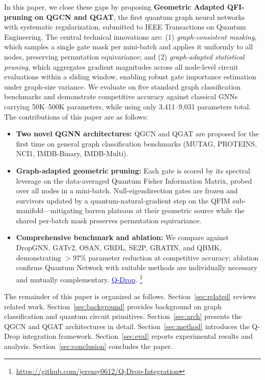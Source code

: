 \documentclass[journal]{IEEEtran}
\begin{document}
In this paper, we close these gaps by proposing \textbf{Geometric Adapted QFI-pruning on QGCN and QGAT}, the first quantum graph neural networks with systematic
regularization, submitted to IEEE Transactions on Quantum Engineering.
The central technical innovations are: (1) \emph{graph-consistent
masking}, which samples a single gate mask per mini-batch and applies
it uniformly to all nodes, preserving permutation equivariance; and
(2) \emph{graph-adapted statistical pruning}, which aggregates gradient
magnitudes across all node-level circuit evaluations within a sliding
window, enabling robust gate importance estimation under graph-size
variance. We evaluate on five standard graph classification benchmarks
and demonstrate competitive accuracy against classical GNNs carrying
50K--500K parameters, while using only 3,411--9,031 parameters total.
The contributions of this paper are as follows:
\begin{itemize}
    \item \textbf{Two novel QGNN architectures:} QGCN and
    QGAT are proposed for the first time on general graph classification
    benchmarks (MUTAG, PROTEINS, NCI1, IMDB-Binary, IMDB-Multi).

    \item \textbf{Graph-adapted geometric pruning:} Each gate is scored by its
    spectral leverage on the data-averaged Quantum Fisher Information Matrix,
    probed over all nodes in a mini-batch. Null-eigendirection gates are
    frozen and survivors updated by a quantum-natural-gradient step on the
    QFIM sub-manifold—mitigating barren plateaus at their geometric source
    while the shared per-batch mask preserves permutation equivariance.

    \item \textbf{Comprehensive benchmark and ablation:} We compare
    against DropGNN, GATv2, OSAN, GRDL, SE2P, GRATIN, and QBMK,
    demonstrating $>$97\% parameter reduction at competitive accuracy;
    ablation confirms Quantum Network with suitable methods are individually necessary and mutually complementary.
    \href{https://github.com/jeremy0612/Q-Drop-Integration}{\textcolor{blue}{Q-Drop}}.
    \footnote{\url{https://github.com/jeremy0612/Q-Drop-Integration}}
\end{itemize}

The remainder of this paper is organized as follows.
Section~\ref{sec:related} reviews related work.
Section~\ref{sec:background} provides background on graph classification
and quantum circuit primitives.
Section~\ref{sec:arch} presents the QGCN and QGAT architectures in detail.
Section~\ref{sec:method} introduces the Q-Drop integration framework.
Section~\ref{sec:eval} reports experimental results and analysis.
Section~\ref{sec:conclusion} concludes the paper.
\end{document}
